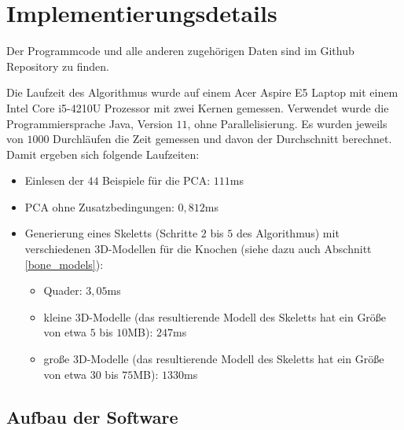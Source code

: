 \chapter{Implementierungsdetails}
\label{chapter:implementation_detail}

Der Programmcode und alle anderen zugehörigen Daten sind im Github Repository \cite{repo} zu finden.

Die Laufzeit des Algorithmus wurde auf einem Acer Aspire E5 Laptop mit einem Intel Core \mbox{i5-4210U} Prozessor mit zwei Kernen gemessen. Verwendet wurde die Programmiersprache Java, Version $11$, ohne Parallelisierung. Es wurden jeweils von $1000$ Durchläufen die Zeit gemessen und davon der Durchschnitt berechnet. Damit ergeben sich folgende Laufzeiten:
\begin{itemize}
 \item Einlesen der $44$ Beispiele für die PCA: $111$ms
 \item PCA ohne Zusatzbedingungen: $0{,}812$ms
 \item Generierung eines Skeletts (Schritte $2$ bis $5$ des Algorithmus) mit verschiedenen 3D-Modellen für die Knochen (siehe dazu auch Abschnitt \ref{bone_models}):
 \begin{itemize}
  \item Quader: $3{,}05$ms
  \item kleine 3D-Modelle (das resultierende Modell des Skeletts hat ein Größe von etwa $5$ bis $10$MB): $247$ms
  \item große 3D-Modelle (das resultierende Modell des Skeletts hat ein Größe von etwa $30$ bis $75$MB): $1330$ms
 \end{itemize}
\end{itemize}



\section{Aufbau der Software}
\label{software_architecture}

